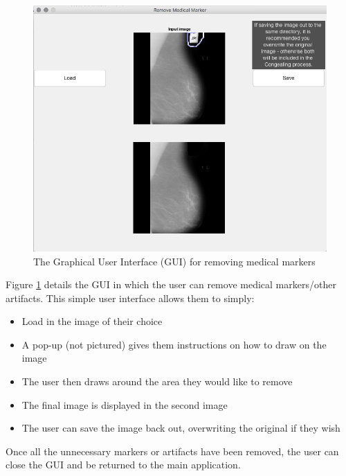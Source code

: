 \begin{figure}[H]
  \center
  \includegraphics[scale=0.5]{Chapter2/software-img/removeMarker.png}
  \caption{The Graphical User Interface (GUI) for removing medical markers}
  \label{fig:medical_gui}
\end{figure}

Figure \ref{fig:medical_gui} details the \acrshort{GUI} in which the user can remove medical markers/other artifacts. This simple user interface allows them to simply:
\begin{itemize}
  \item Load in the image of their choice
  \item A pop-up (not pictured) gives them instructions on how to draw on the image
  \item The user then draws around the area they would like to remove
  \item The final image is displayed in the second image
  \item The user can save the image back out, overwriting the original if they wish
\end{itemize}

Once all the unnecessary markers or artifacts have been removed, the user can close the \acrshort{GUI} and be returned to the main application.
